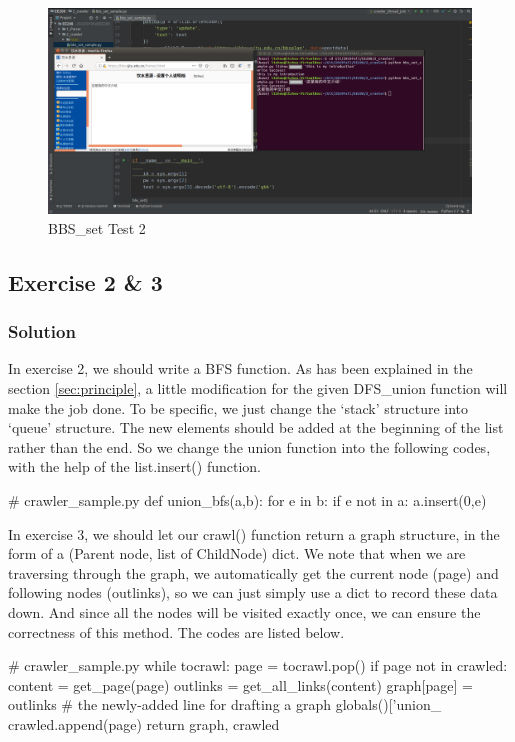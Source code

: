 \documentclass{article}
\begin{document}
\begin{figure}[htbp]
\centering
\includegraphics[width=13.5cm]{img/test1_2.png}
\caption{BBS\_set Test 2}
\label{img:1.2}
\end{figure}

\subsection{Exercise 2 \& 3}

\subsubsection{Solution}

In exercise 2, we should write a BFS function. As has been explained in the section \ref{sec:principle}, a little modification for the given DFS\_union function will make the job done. To be specific, we just change the `stack' structure into `queue' structure. The new elements should be added at the beginning of the list rather than the end. So we change the union function into the following codes, with the help of the list.insert() function. 

\begin{python}
# crawler_sample.py
def union_bfs(a,b):
    for e in b:
        if e not in a:
            a.insert(0,e)
\end{python}

In exercise 3, we should let our crawl() function return a graph structure, in the form of a (Parent node, list of ChildNode) dict. We note that when we are traversing through the graph, we automatically get the current node (page) and following nodes (outlinks), so we can just simply use a dict to record these data down. And since all the nodes will be visited exactly once, we can ensure the correctness of this method. The codes are listed below.

\begin{python}
# crawler_sample.py
while tocrawl:
    page = tocrawl.pop()
    if page not in crawled:        
    content = get_page(page)
        outlinks = get_all_links(content)
        graph[page] = outlinks  # the newly-added line for drafting a graph
        globals()['union_%
        crawled.append(page)
return graph, crawled
\end{python}
\end{document}
